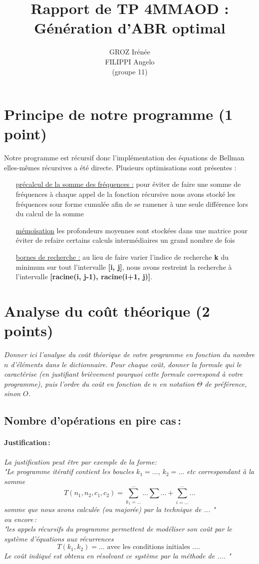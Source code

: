 \documentclass[a4paper, 10pt, french]{article}
\title{Rapport de TP 4MMAOD : Génération d'ABR optimal}
\author{
GROZ Irénée 
\\FILIPPI Angelo 
\\(groupe 11) 
}
\begin{document}
\maketitle


\section{Principe de notre  programme (1 point)}
Notre programme est récursif donc l'implémentation des équations de Bellman elles-mêmes récursives a été directe.
Plusieurs optimisations sont présentes :
\begin{itemize}
\item[\underline{précalcul de la somme des fréquences :}] pour éviter de faire une somme de fréquences à chaque appel de la fonction récursive nous avons stocké les fréquences sour forme cumulée afin de se ramener à une seule différence lors du calcul de la somme
\item[\underline{mémoïsation}] les profondeurs moyennes sont stockées dans une matrice pour éviter de refaire certains calculs intermédiaires un grand nombre de fois
\item[\underline{bornes de recherche :}] au lieu de faire varier l'indice de recherche \textbf{k} du minimum sur tout l'intervalle \textbf{[i, j]}, nous avons restreint la recherche à l'intervalle \textbf{[racine(i, j-1), racine(i+1, j)]}.
\end{itemize}

\section{Analyse du coût théorique (2 points)}
{\em Donner ici l'analyse du coût théorique de votre programme en fonction du nombre $n$ d'éléments dans le dictionnaire.
 Pour chaque coût, donner la formule qui le caractérise (en justifiant brièvement pourquoi cette formule correspond à votre programme), 
 puis l'ordre du coût en fonction de $n$ en notation $\Theta$ de préférence, sinon $O$.}

  \subsection{Nombre  d'opérations en pire cas\,: }
    \paragraph{Justification\,: }
    {\em La justification peut être par exemple de la forme: \\ 
       "Le programme itératif contient les boucles $k_1=...$, $k_2= ...$ etc correspondant à la somme 
      $$T(n_1, n_2, c_1, c_2) = \sum_{k_1=...}^{...} ... \sum ... + \sum_{i=...}^{...} ...$$ 
      somme que nous avons calculée (ou majorée) par la technique de  ... " \\
      ou  encore\,:  \\
      "les appels récursifs du programme permettent de modéliser son coût par le système d'équations aux récurrences 
      $$T(k_1, k_2) = ...  \mbox{~avec~les~conditions~initiales~....~} $$
      Le coût indiqué est obtenu en résolvant ce système par la méthode de  .... "
    } 
\end{document}
